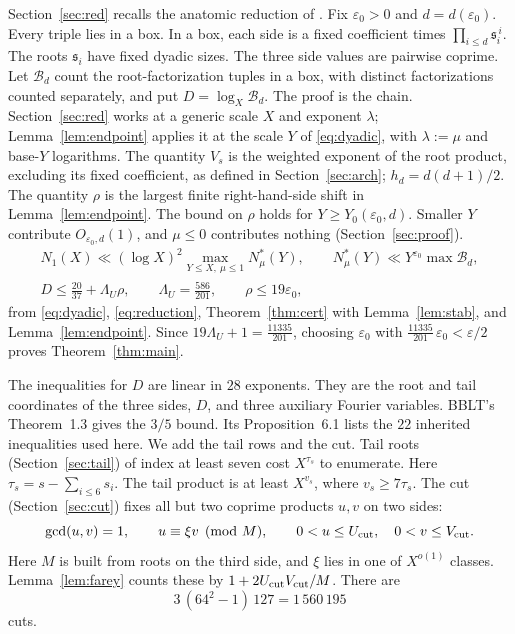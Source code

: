 \documentclass{amsart}
\theoremstyle{definition}
\theoremstyle{plain}
\numberwithin{equation}{section}
\numberwithin{table}{section}
\newcommand{\certLambdaFrac}{\frac{586}{201}}
\newcommand{\certBudget}{\frac{11335}{201}}
\begin{document}
Section~\ref{sec:red} recalls the anatomic reduction of \cite{BLT,Be,BBLT}.
Fix $\varepsilon_0>0$ and $d=d(\varepsilon_0)$. Every triple lies in a box.
In a box, each side is a fixed coefficient times
$\prod_{i\le d}\mathfrak s_i^{\,i}$. The roots $\mathfrak s_i$ have fixed
dyadic sizes. The three side values are pairwise coprime. Let $\mathcal B_d$
count the root-factorization tuples in a box, with distinct factorizations
counted separately, and put $D=\log_X\mathcal B_d$. The proof is the chain.
Section~\ref{sec:red} works at a generic scale $X$ and exponent $\lambda$;
Lemma~\ref{lem:endpoint} applies it at the scale $Y$ of \eqref{eq:dyadic},
with $\lambda:=\mu$ and base-$Y$ logarithms. The quantity $V_s$ is the
weighted exponent of the root product, excluding its fixed coefficient, as
defined in Section~\ref{sec:arch}; $h_d=d(d+1)/2$. The quantity $\rho$ is the
largest finite right-hand-side shift in Lemma~\ref{lem:endpoint}. The bound
on $\rho$ holds for $Y\ge Y_0(\varepsilon_0,d)$. Smaller $Y$ contribute
$O_{\varepsilon_0,d}(1)$, and $\mu\le0$ contributes nothing
(Section~\ref{sec:proof}).
\[
 \begin{gathered}
 N_1(X)\ll(\log X)^2\max_{Y\le X,\ \mu\le1}N^*_\mu(Y),\qquad
 N^*_\mu(Y)\ll Y^{\varepsilon_0}\max\mathcal B_d,\\
 D\le\frac{20}{37}+\Lambda_U\rho,\qquad \Lambda_U=\certLambdaFrac,
 \qquad \rho\le19\varepsilon_0,
 \end{gathered}
\]
from \eqref{eq:dyadic}, \eqref{eq:reduction}, Theorem~\ref{thm:cert} with
Lemma~\ref{lem:stab}, and Lemma~\ref{lem:endpoint}. Since
$19\Lambda_U+1=\certBudget$, choosing $\varepsilon_0$ with
$\certBudget\,\varepsilon_0<\varepsilon/2$ proves Theorem~\ref{thm:main}.

The inequalities for $D$ are linear in $28$ exponents. They are the root and
tail coordinates of the three sides, $D$, and three auxiliary Fourier
variables. BBLT's Theorem~1.3 gives the $3/5$ bound. Its Proposition~6.1 lists
the $22$ inherited inequalities used here. We add the tail
rows and the cut. Tail roots
(Section~\ref{sec:tail}) of index at least seven cost $X^{\tau_s}$ to
enumerate. Here $\tau_s=s-\sum_{i\le6}s_i$. The tail product is at least
$X^{v_s}$, where $v_s\ge7\tau_s$. The cut (Section~\ref{sec:cut}) fixes all
but two coprime products $u,v$ on two sides:
\[
 \gcd(u,v)=1,\qquad u\equiv\xi v\pmod M,\qquad
 0<u\le U_{\rm cut},\quad 0<v\le V_{\rm cut}.
\]
Here $M$ is built from roots on the third side, and $\xi$ lies in one of
$X^{o(1)}$ classes. Lemma~\ref{lem:farey} counts these by
$1+2U_{\rm cut}V_{\rm cut}/M$. There are
\begin{equation}\label{eq:cutcount}
 3\,(64^2-1)\,127=1\,560\,195
\end{equation}
cuts.
\end{document}
